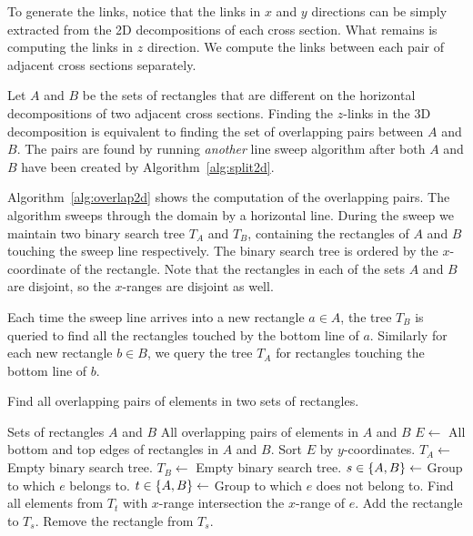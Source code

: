 \documentclass[english,gradu]{tktltiki2018}
\begin{document}
To generate the links, notice that the links in $x$ and $y$ directions can be simply extracted from the 2D decompositions of each cross section.
What remains is computing the links in $z$ direction.
We compute the links between each pair of adjacent cross sections separately.

Let $A$ and $B$ be the sets of rectangles that are different on the horizontal decompositions of two adjacent cross sections.
Finding the $z$-links in the 3D decomposition is equivalent to finding the set of overlapping pairs between $A$ and $B$.
The pairs are found by running \emph{another} line sweep algorithm after both $A$ and $B$ have been created by Algorithm~\ref{alg:split2d}.

Algorithm~\ref{alg:overlap2d} shows the computation of the overlapping pairs.
The algorithm sweeps through the domain by a horizontal line.
During the sweep we maintain two binary search tree $T_A$ and $T_B$, containing the rectangles of $A$ and $B$ touching the sweep line respectively.
The binary search tree is ordered by the $x$-coordinate of the rectangle.
Note that the rectangles in each of the sets $A$ and $B$ are disjoint, so the $x$-ranges are disjoint as well.

Each time the sweep line arrives into a new rectangle $a\in A$, the tree $T_B$ is queried to find all the rectangles touched by the bottom line of $a$.
Similarly for each new rectangle $b\in B$, we query the tree $T_A$ for rectangles touching the bottom line of $b$.

\begin{algorithm}
\caption{Find all overlapping pairs of elements in two sets of rectangles.}\label{alg:overlap2d}
\begin{algorithmic}
\Require Sets of rectangles $A$ and $B$
\Ensure All overlapping pairs of elements in $A$ and $B$
\State $E\gets$ All bottom and top edges of rectangles in $A$ and $B$.
\State Sort $E$ by $y$-coordinates.
\State $T_A\gets$ Empty binary search tree.
\State $T_B\gets$ Empty binary search tree.
	\State $s\in\left\{A,B\right\}\gets$ Group to which $e$ belongs to.
	\State $t\in\left\{A,B\right\}\gets$ Group to which $e$ does not belong to.
		\State Find all elements from $T_t$ with $x$-range intersection the $x$-range of $e$.
		\State Add the rectangle to $T_s$.
	\Else
		\State Remove the rectangle from $T_s$.
	\EndIf
\EndFor
\end{algorithmic}
\end{algorithm}
\end{document}
